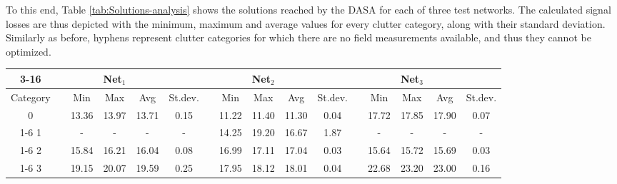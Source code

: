 To this end, Table \ref{tab:Solutions-analysis} shows the solutions
reached by the DASA for each of three test networks. The calculated
signal losses are thus depicted with the minimum, maximum and average
values for every clutter category, along with their standard deviation.
Similarly as before, hyphens represent clutter categories for which
there are no field measurements available, and thus they cannot be
optimized. 

\begin{table*}
\caption{Statistical analysis of the optimization solutions for each test network.
All values are expressed in dB. \label{tab:Solutions-analysis}}


{\footnotesize \centering}{\footnotesize \par}

\begin{tabular}{cccccccccccccccc}
\cline{3-16} 
 &  &  & Net$_{1}$ &  &  &  &  & Net$_{2}$ &  &  &  &  & Net$_{3}$ &  & \tabularnewline
\hline 
{\footnotesize Category} &  & {\footnotesize Min} & {\footnotesize Max} & {\footnotesize Avg} & {\footnotesize St.dev.} &  & {\footnotesize Min} & {\footnotesize Max} & {\footnotesize Avg} & {\footnotesize St.dev.} &  & {\footnotesize Min} & {\footnotesize Max} & {\footnotesize Avg} & {\footnotesize St.dev.}\tabularnewline
\hline 
{\footnotesize 0} &  & {\footnotesize 13.36} & {\footnotesize 13.97} & {\footnotesize 13.71} & {\footnotesize 0.15} &  & {\footnotesize 11.22} & {\footnotesize 11.40} & {\footnotesize 11.30} & {\footnotesize 0.04} &  & {\footnotesize 17.72} & {\footnotesize 17.85} & {\footnotesize 17.90} & {\footnotesize 0.07}\tabularnewline
\cline{1-6} \cline{8-11} \cline{13-16} 
{\footnotesize 1} &  & {\footnotesize -} & {\footnotesize -} & {\footnotesize -} & {\footnotesize -} &  & {\footnotesize 14.25} & {\footnotesize 19.20} & {\footnotesize 16.67} & {\footnotesize 1.87} &  & {\footnotesize -} & {\footnotesize -} & {\footnotesize -} & {\footnotesize -}\tabularnewline
\cline{1-6} \cline{8-11} \cline{13-16} 
{\footnotesize 2} &  & {\footnotesize 15.84} & {\footnotesize 16.21} & {\footnotesize 16.04} & {\footnotesize 0.08} &  & {\footnotesize 16.99} & {\footnotesize 17.11} & {\footnotesize 17.04} & {\footnotesize 0.03} &  & {\footnotesize 15.64} & {\footnotesize 15.72} & {\footnotesize 15.69} & {\footnotesize 0.03}\tabularnewline
\cline{1-6} \cline{8-11} \cline{13-16} 
{\footnotesize 3} &  & {\footnotesize 19.15} & {\footnotesize 20.07} & {\footnotesize 19.59} & {\footnotesize 0.25} &  & {\footnotesize 17.95} & {\footnotesize 18.12} & {\footnotesize 18.01} & {\footnotesize 0.04} &  & {\footnotesize 22.68} & {\footnotesize 23.20} & {\footnotesize 23.00} & {\footnotesize 0.16}\tabularnewline

\end{tabular}
\end{table*}
